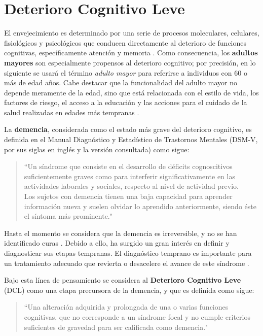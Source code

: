 \documentclass[12pt,letterpaper]{book}
\begin{document}

\section{Deterioro Cognitivo Leve}
\label{seccion:dcl}

El envejecimiento es determinado por una serie de procesos moleculares, celulares, fisiológicos y psicológicos que conducen directamente al deterioro de funciones cognitivas, específicamente atención y memoria \cite{Park09}.
%
Como consecuencia, los \textbf{adultos mayores} son especialmente propensos al deterioro cognitivo; por precisión, en lo siguiente se usará el término \textit{adulto mayor} para referirse a individuos con 60 o más de edad años.
%
Cabe destacar que la funcionalidad del adulto mayor no depende meramente de la edad, sino que está relacionada con el estilo de vida, los factores de riesgo, el acceso a la educación y las acciones para el cuidado de la salud realizadas en edades más tempranas \cite{Sanhueza14}.
 
La \textbf{demencia}, considerada como el estado más grave del deterioro cognitivo, es definida en el Manual Diagnóstico y Estadístico de Trastornos Mentales (DSM-V, por sus siglas en inglés y la versión consultada) como sigue:
\begin{quote}
``Un síndrome que consiste en el desarrollo de déficits cognoscitivos suficientemente graves como para interferir significativamente en las actividades laborales y sociales, respecto al nivel de actividad previo.\\
%
Los sujetos con demencia tienen una baja capacidad para aprender información nueva y suelen olvidar lo aprendido anteriormente, siendo éste el síntoma más prominente."  \cite{DCM5}
\end{quote}

Hasta el momento se considera que la demencia es irreversible, y no se han identificado curas \cite{PlanAlzheimer04}. 
%
Debido a ello, ha surgido un gran interés en definir y diagnosticar sus etapas tempranas. 
%
El diagnóstico temprano es importante para un tratamiento adecuado que revierta o desacelere el avance de este síndrome \cite{Knopman01}.

Bajo esta línea de pensamiento se considera al \textbf{Deterioro Cognitivo Leve} (DCL) como una etapa precursora de la demencia, y que es definida como sigue: 
\begin{quote}
``Una alteración adquirida y prolongada de una o varias funciones cognitivas, que no corresponde a un síndrome focal y no cumple criterios suficientes de gravedad para ser calificada como demencia." \cite{Robles02}
\end{quote}
\end{document}
